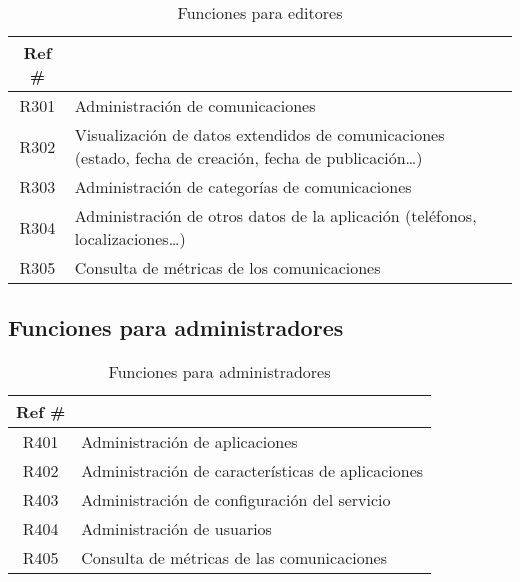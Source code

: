 \begin{table}[ht]
    \centering
    \begin{tabularx}{\textwidth}{|cX|}
    \rowcolor[HTML]{9B9B9B} 
    {\color[HTML]{FFFFFF} Ref \#} &
      \multicolumn{1}{l}{\cellcolor[HTML]{9B9B9B}{\color[HTML]{FFFFFF} Función}} \\ \hline
    R301\label{R301} & Administración de comunicaciones \\
    R302\label{R302} & Visualización de datos extendidos de comunicaciones (estado, fecha de creación, fecha de publicación\dots) \\
    R303\label{R303} & Administración de categorías de comunicaciones \\
    R304\label{R304} & Administración de otros datos de la aplicación (teléfonos, localizaciones\dots) \\ 
    R305\label{R305} & Consulta de métricas de los comunicaciones \\ 
    \hline
    \end{tabularx}
    \caption{Funciones para editores}
    \label{cuadro:funciones-editores }
\end{table}

\subsection{Funciones para administradores}

\begin{table}[ht]
    \centering
    \begin{tabularx}{\textwidth}{|cX|}
    \rowcolor[HTML]{9B9B9B} 
    {\color[HTML]{FFFFFF} Ref \#} &
      \multicolumn{1}{l}{\cellcolor[HTML]{9B9B9B}{\color[HTML]{FFFFFF} Función}} \\ \hline
    R401\label{R401} & Administración de aplicaciones \\
    R402\label{R402} & Administración de características de aplicaciones \\
    R403\label{R403} & Administración de configuración del servicio \\
    R404\label{R404} & Administración de usuarios \\ 
    R405\label{R405} & Consulta de métricas de las comunicaciones \\ 
    \hline
    \end{tabularx}
    \caption{Funciones para administradores}
    \label{cuadro:funciones-administradores }
\end{table}

